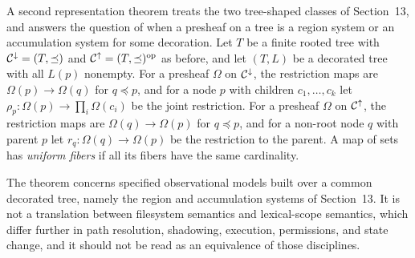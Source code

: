 A second representation theorem treats the two tree-shaped classes of Section~13, and answers the question of when a presheaf on a tree is a region system or an accumulation system for some decoration. Let $T$ be a finite rooted tree with $\mathcal C^{\downarrow}=(T,\preceq)$ and $\mathcal C^{\uparrow}=(T,\preceq)^{\mathrm{op}}$ as before, and let $(T,L)$ be a decorated tree with all $L(p)$ nonempty. For a presheaf $\Omega$ on $\mathcal C^{\downarrow}$, the restriction maps are $\Omega(p)\to\Omega(q)$ for $q\preceq p$, and for a node $p$ with children $c_1,\dots,c_k$ let $\rho_p:\Omega(p)\to\prod_i\Omega(c_i)$ be the joint restriction. For a presheaf $\Omega$ on $\mathcal C^{\uparrow}$, the restriction maps are $\Omega(q)\to\Omega(p)$ for $q\preceq p$, and for a non-root node $q$ with parent $p$ let $r_q:\Omega(q)\to\Omega(p)$ be the restriction to the parent. A map of sets has \emph{uniform fibers} if all its fibers have the same cardinality.

The theorem concerns specified observational models built over a common decorated tree, namely the region and accumulation systems of Section~13. It is not a translation between filesystem semantics and lexical-scope semantics, which differ further in path resolution, shadowing, execution, permissions, and state change, and it should not be read as an equivalence of those disciplines.

